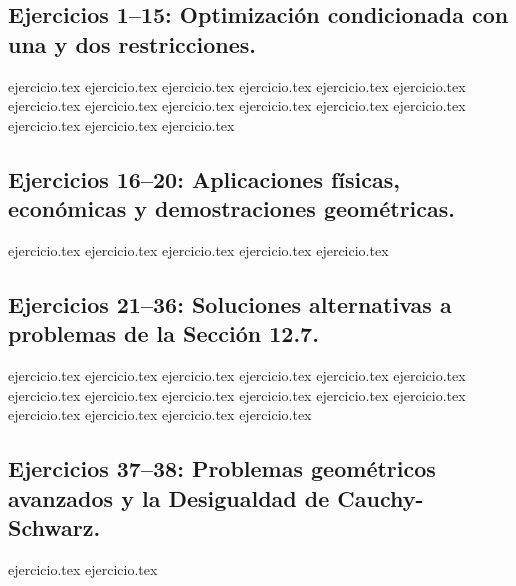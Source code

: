 
\subsection*{Ejercicios 1--15: Optimización condicionada con una y dos restricciones.}
\begin{enumerate}
    {ejercicio.tex}
    {ejercicio.tex}
    {ejercicio.tex}
    {ejercicio.tex}
    {ejercicio.tex}
    {ejercicio.tex}
    {ejercicio.tex}
    {ejercicio.tex}
    {ejercicio.tex}
    {ejercicio.tex}
    {ejercicio.tex}
    {ejercicio.tex}
    {ejercicio.tex}
    {ejercicio.tex}
    {ejercicio.tex}
\end{enumerate}

\subsection*{Ejercicios 16--20: Aplicaciones físicas, económicas y demostraciones geométricas.}
\begin{enumerate}
    \setcounter{enumi}{15}
    {ejercicio.tex}
    {ejercicio.tex}
    {ejercicio.tex}
    {ejercicio.tex}
    {ejercicio.tex}
\end{enumerate}

\subsection*{Ejercicios 21--36: Soluciones alternativas a problemas de la Sección 12.7.}
\begin{enumerate}
    \setcounter{enumi}{20}
    {ejercicio.tex}
    {ejercicio.tex}
    {ejercicio.tex}
    {ejercicio.tex}
    {ejercicio.tex}
    {ejercicio.tex}
    {ejercicio.tex}
    {ejercicio.tex}
    {ejercicio.tex}
    {ejercicio.tex}
    {ejercicio.tex}
    {ejercicio.tex}
    {ejercicio.tex}
    {ejercicio.tex}
    {ejercicio.tex}
    {ejercicio.tex}
\end{enumerate}

\subsection*{Ejercicios 37--38: Problemas geométricos avanzados y la Desigualdad de Cauchy-Schwarz.}
\begin{enumerate}
    \setcounter{enumi}{36}
    {ejercicio.tex}
    {ejercicio.tex}
\end{enumerate}
